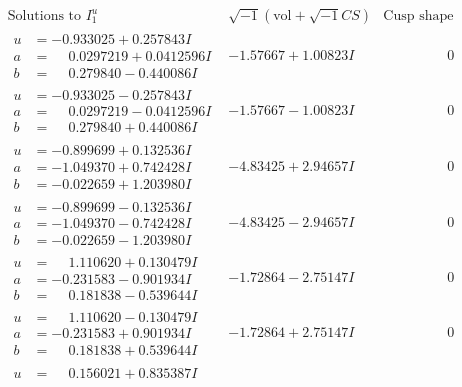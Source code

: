 \documentclass[1p]{elsarticle_modified}
\theoremstyle{definition}
\newcommand{\I}{\sqrt{-1}}
\begin{document}
$$\begin{array}{c|c|c}  
\text{Solutions to }I^u_{1}& \I (\text{vol} + \sqrt{-1}CS) & \text{Cusp shape}\\
 \hline 
\begin{aligned}
u &= -0.933025 + 0.257843 I \\
a &= \phantom{-}0.0297219 + 0.0412596 I \\
b &= \phantom{-}0.279840 - 0.440086 I\end{aligned}
 & -1.57667 + 1.00823 I & \phantom{-0.000000 } 0 \\ \hline\begin{aligned}
u &= -0.933025 - 0.257843 I \\
a &= \phantom{-}0.0297219 - 0.0412596 I \\
b &= \phantom{-}0.279840 + 0.440086 I\end{aligned}
 & -1.57667 - 1.00823 I & \phantom{-0.000000 } 0 \\ \hline\begin{aligned}
u &= -0.899699 + 0.132536 I \\
a &= -1.049370 + 0.742428 I \\
b &= -0.022659 + 1.203980 I\end{aligned}
 & -4.83425 + 2.94657 I & \phantom{-0.000000 } 0 \\ \hline\begin{aligned}
u &= -0.899699 - 0.132536 I \\
a &= -1.049370 - 0.742428 I \\
b &= -0.022659 - 1.203980 I\end{aligned}
 & -4.83425 - 2.94657 I & \phantom{-0.000000 } 0 \\ \hline\begin{aligned}
u &= \phantom{-}1.110620 + 0.130479 I \\
a &= -0.231583 - 0.901934 I \\
b &= \phantom{-}0.181838 - 0.539644 I\end{aligned}
 & -1.72864 - 2.75147 I & \phantom{-0.000000 } 0 \\ \hline\begin{aligned}
u &= \phantom{-}1.110620 - 0.130479 I \\
a &= -0.231583 + 0.901934 I \\
b &= \phantom{-}0.181838 + 0.539644 I\end{aligned}
 & -1.72864 + 2.75147 I & \phantom{-0.000000 } 0 \\ \hline\begin{aligned}
u &= \phantom{-}0.156021 + 0.835387 I \\

\end{aligned}
\end{array}$$
\end{document}
